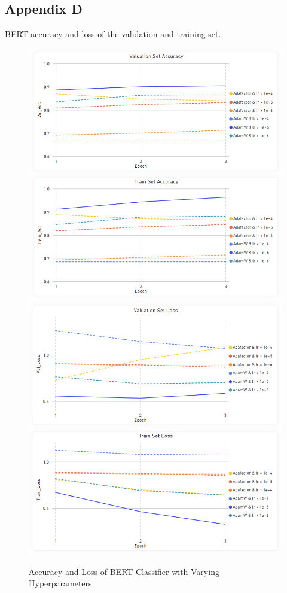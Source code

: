 \documentclass[11pt, a4paper]{article}
\begin{document}
\pagebreak
\subsection{Appendix D}
BERT accuracy and loss of the validation and training set.
\label{appendix:BERT_Sentiment_Classifier}
\begin{figure}[!htb]
    \centering
    \includegraphics[scale=0.43]{BERT_Accuracy.png}
    \includegraphics[scale=0.43]{BERT_Loss.png}
    \caption{Accuracy and Loss of BERT-Classifier with Varying Hyperparameters}
    \label{fig:bert_acc_loss}
\end{figure}
\end{document}
